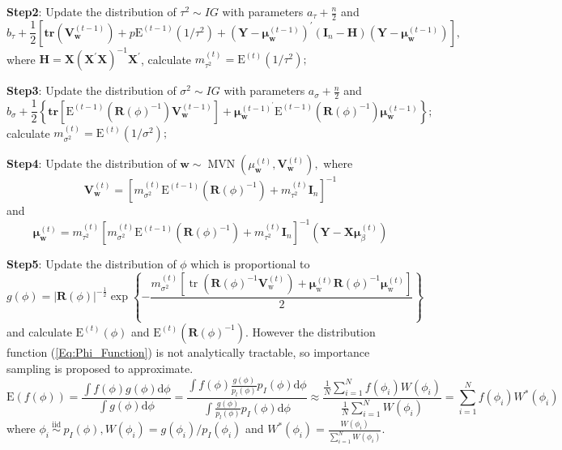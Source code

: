 \documentclass[
]{article}
\begin{document}
\textbf{Step2}: Update the distribution of \(\tau^{2} \sim I G\) with
parameters \(a_{\tau}+\frac{n}{2}\) and \[
b_{\tau}+\frac{1}{2}\left[\textbf{tr}\left(\mathbf{V}_{\mathbf{w}}^{(t-1)}\right)+p \mathrm{E}^{(t-1)}\left(1 / \tau^{2}\right)+\left(\mathbf{Y}-\boldsymbol{\mu}_{\mathbf{w}}^{(t-1)}\right)^{\prime}\left(\mathbf{I}_{n}-\mathbf{H}\right)\left(\mathbf{Y}-\boldsymbol{\mu}_{\mathbf{w}}^{(t-1)}\right)\right],\]
where
\(\mathbf{H}=\mathbf{X}\left(\mathbf{X}^{\prime} \mathbf{X}\right)^{-1} \mathbf{X}^{\prime}\),
calculate
\(m_{\tau^{2}}^{(t)}=\mathrm{E}^{(t)}\left(1 / \tau^{2}\right);\)

\textbf{Step3}: Update the distribution of \(\sigma^{2} \sim I G\) with
parameters \(a_{\sigma}+\frac{n}{2}\) and \[
b_{\sigma}+\frac{1}{2}\left\{\textbf{tr}\left[\mathrm{E}^{(t-1)}\left(\mathbf{R}(\phi)^{-1}\right) \mathbf{V}_{\mathbf{w}}^{(t-1)}\right]+ \bm{\mu}_{\mathbf{w}}^{(t-1)^{\prime}} \mathrm{E}^{(t-1)}\left(\mathbf{R}(\phi)^{-1}\right) \boldsymbol{\mu}_{\mathbf{w}}^{(t-1)}\right\};
\] calculate
\(m_{\sigma^{2}}^{(t)}=\mathrm{E}^{(t)}\left(1 / \sigma^{2}\right);\)

\textbf{Step4}: Update the distribution of
\(\mathbf{w} \sim \operatorname{MVN}\left(\mu_{\mathbf{w}}^{(t)}, \mathbf{V}_{\mathbf{w}}^{(t)}\right),\)
where \[
\mathbf{V}_{\mathbf{w}}^{(t)}=\left[m_{\sigma^{2}}^{(t)} \mathrm{E}^{(t-1)}\left(\mathbf{R}(\phi)^{-1}\right)+m_{\tau^{2}}^{(t)} \mathbf{I}_{n}\right]^{-1}
\] and \[
\boldsymbol{\mu}_{\mathbf{w}}^{(t)}=m_{\tau^{2}}^{(t)}\left[m_{\sigma^{2}}^{(t)} \mathrm{E}^{(t-1)}\left(\mathbf{R}(\phi)^{-1}\right)+m_{\tau^{2}}^{(t)} \mathbf{I}_{n}\right]^{-1}\left(\mathbf{Y}-\mathbf{X} \boldsymbol{\mu}_{\beta}^{(t)}\right)
\]

\textbf{Step5}: Update the distribution of \(\phi\) which is
proportional to \begin{equation}
g(\phi)=|\mathbf{R}(\phi)|^{-\frac{1}{2}} \exp \left\{-\frac{m_{\sigma^{2}}^{(t)}\left[\operatorname{tr}\left(\mathbf{R}(\phi)^{-1} \mathbf{V}_{\mathrm{w}}^{(t)}\right)+\boldsymbol{\mu}_{\mathrm{w}}^{(t)} \mathbf{R}(\phi)^{-1} \boldsymbol{\mu}_{\mathrm{w}}^{(t)}\right]}{2}\right\} \label{Eq:Phi_Function}
\end{equation} and calculate \(\mathrm{E}^{(t)}(\phi)\) and
\(\mathrm{E}^{(t)}\left(\mathbf{R}(\phi)^{-1}\right).\) However the
distribution function (\ref{Eq:Phi_Function}) is not analytically
tractable, so importance sampling is proposed to approximate.
\begin{equation}
\mathrm{E}(f(\phi))=\frac{\int f(\phi) g(\phi) \mathrm{d} \phi}{\int g(\phi) \mathrm{d} \phi}=\frac{\int f(\phi) \frac{g(\phi)}{p_{l}(\phi)} p_{I}(\phi) \mathrm{d} \phi}{\int \frac{g(\phi)}{p_{l}(\phi)} p_{I}(\phi) \mathrm{d} \phi} \approx \frac{\frac{1}{N} \sum_{i=1}^{N} f\left(\phi_{i}\right) W\left(\phi_{i}\right)}{\frac{1}{N} \sum_{i=1}^{N} W\left(\phi_{i}\right)}=\sum_{i=1}^{N} f\left(\phi_{i}\right) W^{*}\left(\phi_{i}\right) \label{Eq:IS}
\end{equation} where
\(\phi_{i} \stackrel{\text { iid }}{\sim} p_{I}(\phi), W\left(\phi_{i}\right)=g\left(\phi_{i}\right) / p_{I}\left(\phi_{i}\right)\)
and
\(W^{*}\left(\phi_{i}\right)=\frac{W\left(\phi_{i}\right)}{\sum_{i=1}^{N} W\left(\phi_{i}\right)}\).
\end{document}
